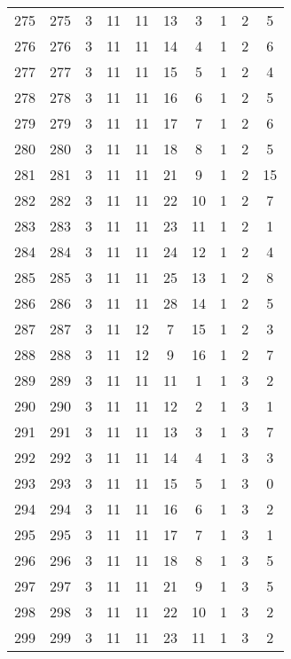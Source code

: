 \begin{longtable}{cccccccccc}
  275 & 275 &   3 &  11 &  11 &  13 &   3 &   1 &   2 &   5 \\ 
  276 & 276 &   3 &  11 &  11 &  14 &   4 &   1 &   2 &   6 \\ 
  277 & 277 &   3 &  11 &  11 &  15 &   5 &   1 &   2 &   4 \\ 
  278 & 278 &   3 &  11 &  11 &  16 &   6 &   1 &   2 &   5 \\ 
  279 & 279 &   3 &  11 &  11 &  17 &   7 &   1 &   2 &   6 \\ 
  280 & 280 &   3 &  11 &  11 &  18 &   8 &   1 &   2 &   5 \\ 
  281 & 281 &   3 &  11 &  11 &  21 &   9 &   1 &   2 &  15 \\ 
  282 & 282 &   3 &  11 &  11 &  22 &  10 &   1 &   2 &   7 \\ 
  283 & 283 &   3 &  11 &  11 &  23 &  11 &   1 &   2 &   1 \\ 
  284 & 284 &   3 &  11 &  11 &  24 &  12 &   1 &   2 &   4 \\ 
  285 & 285 &   3 &  11 &  11 &  25 &  13 &   1 &   2 &   8 \\ 
  286 & 286 &   3 &  11 &  11 &  28 &  14 &   1 &   2 &   5 \\ 
  287 & 287 &   3 &  11 &  12 &   7 &  15 &   1 &   2 &   3 \\ 
  288 & 288 &   3 &  11 &  12 &   9 &  16 &   1 &   2 &   7 \\ 
  289 & 289 &   3 &  11 &  11 &  11 &   1 &   1 &   3 &   2 \\ 
  290 & 290 &   3 &  11 &  11 &  12 &   2 &   1 &   3 &   1 \\ 
  291 & 291 &   3 &  11 &  11 &  13 &   3 &   1 &   3 &   7 \\ 
  292 & 292 &   3 &  11 &  11 &  14 &   4 &   1 &   3 &   3 \\ 
  293 & 293 &   3 &  11 &  11 &  15 &   5 &   1 &   3 &   0 \\ 
  294 & 294 &   3 &  11 &  11 &  16 &   6 &   1 &   3 &   2 \\ 
  295 & 295 &   3 &  11 &  11 &  17 &   7 &   1 &   3 &   1 \\ 
  296 & 296 &   3 &  11 &  11 &  18 &   8 &   1 &   3 &   5 \\ 
  297 & 297 &   3 &  11 &  11 &  21 &   9 &   1 &   3 &   5 \\ 
  298 & 298 &   3 &  11 &  11 &  22 &  10 &   1 &   3 &   2 \\ 
  299 & 299 &   3 &  11 &  11 &  23 &  11 &   1 &   3 &   2 \\ 

\end{longtable}
